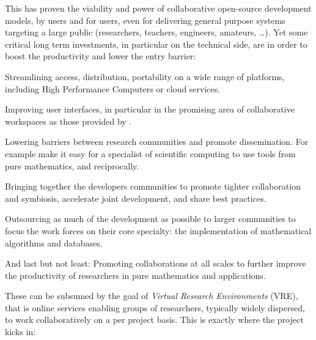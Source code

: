 This has proven the viability and power of collaborative open-source development models,
by users and for users, even for delivering general purpose systems targeting a large
public (researchers, teachers, engineers, amateurs, \ldots). Yet some critical long term
investments, in particular on the technical side, are in order to boost the productivity
and lower the entry barrier:
\begin{compactitem}
\item Streamlining access, distribution, portability on a wide range of platforms, including
  High Performance Computers or cloud services.
\item Improving user interfaces, in particular in the promising area of collaborative
  workspaces as those provided by \SMC.
\item Lowering barriers between research communities and promote dissemination. For example
  make it easy for a specialist of scientific computing to use tools from pure
  mathematics, and reciprocally.
\item Bringing together the developers communities to promote tighter collaboration and
  symbiosis, accelerate joint development, and share best practices.
\item Outsourcing as much of the development as possible to larger communities to focus
  the work forces on their core specialty: the implementation of mathematical algorithms
  and databases.
\item And last but not least: Promoting collaborations at all scales to further improve
  the productivity of researchers in pure mathematics and applications.
\end{compactitem}
These can be subsumed by the goal of \emph{Virtual Research Environments} (VRE), that is
online services enabling groups of researchers, typically widely dispersed, to work
collaboratively on a per project basis. This is exactly where the \ODK project kicks in:


